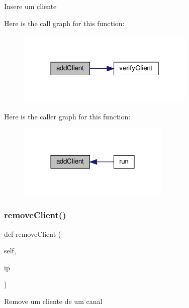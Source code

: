 \begin{DoxyVerb}Insere um cliente\end{DoxyVerb}
 Here is the call graph for this function\+:
\nopagebreak
\begin{figure}[H]
\begin{center}
\leavevmode
\includegraphics[width=240pt]{class_client_1_1_client_reseiver_a011b151c914b97254dbfb0c745ce6c84_cgraph}
\end{center}
\end{figure}
Here is the caller graph for this function\+:
\nopagebreak
\begin{figure}[H]
\begin{center}
\leavevmode
\includegraphics[width=204pt]{class_client_1_1_client_reseiver_a011b151c914b97254dbfb0c745ce6c84_icgraph}
\end{center}
\end{figure}
\mbox{\label{class_client_1_1_client_reseiver_a0469460401aae7675477714179dfcf6f}} 
\subsubsection{\texorpdfstring{remove\+Client()}{removeClient()}}
{\footnotesize\ttfamily def remove\+Client (\begin{DoxyParamCaption}\item[{}]{self,  }\item[{}]{ip }\end{DoxyParamCaption})}

\begin{DoxyVerb}Remove um cliente de um canal\end{DoxyVerb}
 \mbox{\label{class_client_1_1_client_reseiver_ad22709b2e67308af35f55680d5a026e0}} 
